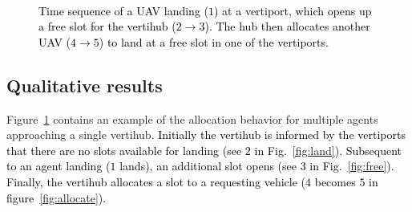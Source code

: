 \begin{figure}[h]
\centering
    ~
    ~
    \caption{\textcolor{black}{Time sequence of a UAV landing ($1$) at a vertiport, which opens up a free slot for the vertihub ($2\rightarrow3$). The hub then allocates another UAV ($4\rightarrow 5$) to land at a free slot in one of the vertiports.}}
    \label{fig:sequence}
\end{figure}

\subsection{Qualitative results}

Figure~\ref{fig:sequence} contains an example of the allocation behavior for multiple agents approaching a single vertihub.
\textcolor{black}{Initially the vertihub is informed by the vertiports that there are no slots available for landing (see $2$ in Fig.~\ref{fig:land}). Subsequent to an agent landing ($1$ lands), an additional slot opens (see $3$ in Fig.~\ref{fig:free}).
Finally, the vertihub allocates a slot to a requesting vehicle ($4$ becomes $5$ in figure~\ref{fig:allocate}).} 

